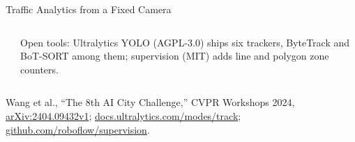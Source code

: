 \begin{frame}{Traffic Analytics from a Fixed Camera}
\begin{columns}[T,onlytextwidth]
\begin{tikzpicture}
      \end{tikzpicture}\\[0.4em]
      {\scriptsize Open tools: Ultralytics YOLO (AGPL-3.0) ships six trackers, ByteTrack and BoT-SORT among them; supervision (MIT) adds line and polygon zone counters.\par}
  \end{columns}
  \vspace{0.3em}
  {\scriptsize Wang et al., ``The 8th AI City Challenge,'' CVPR Workshops 2024, \href{https://arxiv.org/abs/2404.09432v1}{arXiv:2404.09432v1}; \href{https://docs.ultralytics.com/modes/track/}{docs.ultralytics.com/modes/track}; \href{https://github.com/roboflow/supervision}{github.com/roboflow/supervision}.\par}
\end{frame}

